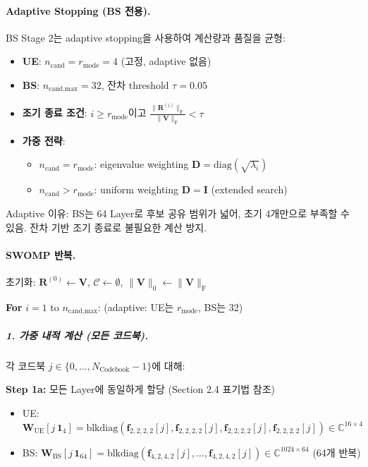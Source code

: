 \documentclass[10pt]{article}
\begin{document}
\paragraph{Adaptive Stopping (BS 전용).}
BS Stage 2는 adaptive stopping을 사용하여 계산량과 품질을 균형:
\begin{itemize}
    \item \textbf{UE}: $n_{\text{cand}} = r_{\text{mode}} = 4$ (고정, adaptive 없음)
    \item \textbf{BS}: $n_{\text{cand,max}} = 32$, 잔차 threshold $\tau = 0.05$
    \item \textbf{조기 종료 조건}: $i \geq r_{\text{mode}}$이고 $\frac{\|\mathbf{R}^{(i)}\|_{\text{F}}}{\|\mathbf{V}\|_{\text{F}}} < \tau$
    \item \textbf{가중 전략}:
    \begin{itemize}
        \item $n_{\text{cand}} = r_{\text{mode}}$: eigenvalue weighting $\mathbf{D} = \text{diag}(\sqrt{\lambda_i})$
        \item $n_{\text{cand}} > r_{\text{mode}}$: uniform weighting $\mathbf{D} = \mathbf{I}$ (extended search)
    \end{itemize}
\end{itemize}

Adaptive 이유: BS는 64 Layer로 후보 공유 범위가 넓어, 초기 4개만으로 부족할 수 있음. 잔차 기반 조기 종료로 불필요한 계산 방지.

\paragraph{SWOMP 반복.}
초기화: $\mathbf{R}^{(0)} \gets \mathbf{V}$, $\mathcal{C} \gets \emptyset$, $\|\mathbf{V}\|_0 \gets \|\mathbf{V}\|_{\text{F}}$

\textbf{For} $i = 1$ to $n_{\text{cand,max}}$: (adaptive: UE는 $r_{\text{mode}}$, BS는 32)

\subparagraph{1. 가중 내적 계산 (모든 코드북).}
각 코드북 $j \in \{0, \ldots, N_{\text{Codebook}}-1\}$에 대해:

\textbf{Step 1a:} 모든 Layer에 동일하게 할당 (Section 2.4 표기법 참조)
\begin{itemize}
    \item UE: $\mathbf{W}_{\text{UE}}[j\,\mathbf{1}_4] = \text{blkdiag}(\mathbf{f}_{2,2,2,2}[j], \mathbf{f}_{2,2,2,2}[j], \mathbf{f}_{2,2,2,2}[j], \mathbf{f}_{2,2,2,2}[j]) \in \mathbb{C}^{16 \times 4}$
    \item BS: $\mathbf{W}_{\text{BS}}[j\,\mathbf{1}_{64}] = \text{blkdiag}(\mathbf{f}_{4,2,4,2}[j], \ldots, \mathbf{f}_{4,2,4,2}[j]) \in \mathbb{C}^{1024 \times 64}$ (64개 반복)
\end{itemize}
\end{document}
